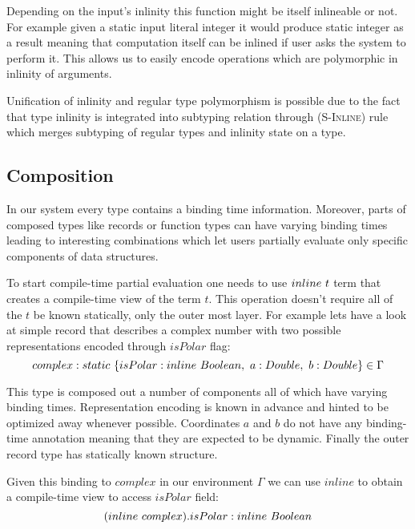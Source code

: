 Depending on the input's inlinity this function might be itself inlineable or not. For example
given a static input literal integer it would produce static integer as a result meaning that 
computation itself can be inlined if user asks the system to perform it. This allows
us to easily encode operations which are polymorphic in inlinity of arguments.

Unification of inlinity and regular type polymorphism is possible due to the fact that type
inlinity is integrated into subtyping relation through (\textsc{S-Inline}) rule which merges
subtyping of regular types and inlinity state on a type.

\fi

\subsection{Composition}

In our system every type contains a binding time information. Moreover, parts of composed
types like records or function types can have varying binding times leading to interesting 
combinations which let users partially evaluate only specific components of data structures.

To start compile-time partial evaluation one needs to use $inline\ t$ term that creates a 
compile-time view of the term $t$. This operation doesn't require all of the $t$ be
known statically, only the outer most layer. For example lets have a look at simple record
that describes a complex number with two possible representations encoded through $isPolar$ flag:
\begin{equation}\nonumber
    complex: static\ \{ isPolar: inline\ Boolean,\ a: Double,\ b: Double \} \in \Gamma
\end{equation}

This type is composed out a number of components all of which have varying binding times. 
Representation encoding is known in advance and hinted to be optimized away whenever possible.
Coordinates $a$ and $b$ do not have any binding-time annotation meaning that they are expected
to be dynamic. Finally the outer record type has statically known structure. 

Given this binding to $complex$ in our environment $\Gamma$ we can use $inline$ to obtain
a compile-time view to access $isPolar$ field:
\begin{equation}\nonumber
  (inline\ complex).isPolar: inline\ Boolean
\end{equation}

